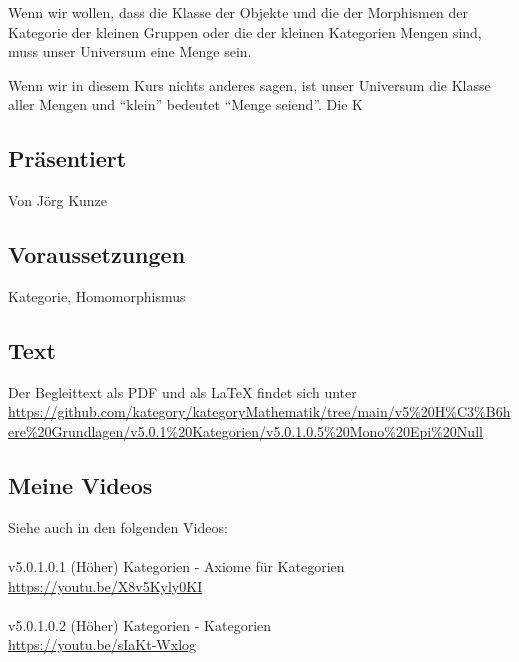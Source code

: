 \documentclass[a4paper]{amsart}
\theoremstyle{definition}
\begin{document}
Wenn wir wollen, dass die Klasse der Objekte und die der Morphismen der Kategorie der kleinen Gruppen oder die der kleinen Kategorien Mengen sind, muss unser Universum eine Menge sein.

Wenn wir in diesem Kurs nichts anderes sagen, ist unser Universum die Klasse aller Mengen und "`klein"' bedeutet "`Menge seiend"'. Die K

\subsection*{Präsentiert}
Von Jörg Kunze

\subsection*{Voraussetzungen}
Kategorie, Homomorphismus

\subsection*{Text}
Der Begleittext als PDF und als LaTeX findet sich unter
{\tiny
   \url{https://github.com/kategory/kategoryMathematik/tree/main/v5%20H%C3%B6here%20Grundlagen/v5.0.1%20Kategorien/v5.0.1.0.5%20Mono%20Epi%20Null}
}

\subsection*{Meine Videos}
Siehe auch in den folgenden Videos:\\
\\
v5.0.1.0.1 (Höher) Kategorien - Axiome für Kategorien\\
\url{https://youtu.be/X8v5Kyly0KI}\\
\\
v5.0.1.0.2 (Höher) Kategorien - Kategorien\\
\url{https://youtu.be/sIaKt-Wxlog}\\
\end{document}

